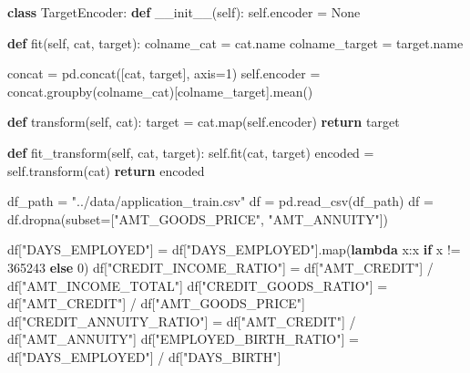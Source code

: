 \documentclass[11pt]{jsarticle}
\newenvironment{Shaded}{}{}
\newcommand{\KeywordTok}[1]{\textcolor[rgb]{0.00,0.44,0.13}{\textbf{{#1}}}}
\newcommand{\DecValTok}[1]{\textcolor[rgb]{0.25,0.63,0.44}{{#1}}}
\newcommand{\StringTok}[1]{\textcolor[rgb]{0.25,0.44,0.63}{{#1}}}
\newcommand{\FunctionTok}[1]{\textcolor[rgb]{0.02,0.16,0.49}{{#1}}}
\newcommand{\NormalTok}[1]{{#1}}
\newcommand{\VariableTok}[1]{\textcolor[rgb]{0.10,0.09,0.49}{{#1}}}
\newcommand{\ControlFlowTok}[1]{\textcolor[rgb]{0.00,0.44,0.13}{\textbf{{#1}}}}
\newcommand{\OperatorTok}[1]{\textcolor[rgb]{0.40,0.40,0.40}{{#1}}}
\newcommand{\BuiltInTok}[1]{{#1}}
\begin{document}
    \begin{Shaded}
\begin{Highlighting}[]
\KeywordTok{class}\NormalTok{ TargetEncoder:}
    \KeywordTok{def} \FunctionTok{__init__}\NormalTok{(}\VariableTok{self}\NormalTok{):}
        \VariableTok{self}\NormalTok{.encoder }\OperatorTok{=} \VariableTok{None}
        
    \KeywordTok{def}\NormalTok{ fit(}\VariableTok{self}\NormalTok{, cat, target):}
\NormalTok{        colname_cat }\OperatorTok{=}\NormalTok{ cat.name}
\NormalTok{        colname_target }\OperatorTok{=}\NormalTok{ target.name}
        
\NormalTok{        concat }\OperatorTok{=}\NormalTok{ pd.concat([cat, target], axis}\OperatorTok{=}\DecValTok{1}\NormalTok{)}
        \VariableTok{self}\NormalTok{.encoder }\OperatorTok{=}\NormalTok{ concat.groupby(colname_cat)[colname_target].mean()}
    
    \KeywordTok{def}\NormalTok{ transform(}\VariableTok{self}\NormalTok{, cat):}
\NormalTok{        target }\OperatorTok{=}\NormalTok{ cat.}\BuiltInTok{map}\NormalTok{(}\VariableTok{self}\NormalTok{.encoder)}
        \ControlFlowTok{return}\NormalTok{ target}
    
    \KeywordTok{def}\NormalTok{ fit_transform(}\VariableTok{self}\NormalTok{, cat, target):}
        \VariableTok{self}\NormalTok{.fit(cat, target)}
\NormalTok{        encoded }\OperatorTok{=} \VariableTok{self}\NormalTok{.transform(cat)}
        \ControlFlowTok{return}\NormalTok{ encoded}

\NormalTok{df_path }\OperatorTok{=} \StringTok{"../data/application_train.csv"}
\NormalTok{df }\OperatorTok{=}\NormalTok{ pd.read_csv(df_path)}
\NormalTok{df }\OperatorTok{=}\NormalTok{ df.dropna(subset}\OperatorTok{=}\NormalTok{[}\StringTok{"AMT_GOODS_PRICE"}\NormalTok{, }\StringTok{"AMT_ANNUITY"}\NormalTok{])}

\NormalTok{df[}\StringTok{"DAYS_EMPLOYED"}\NormalTok{] }\OperatorTok{=}\NormalTok{ df[}\StringTok{"DAYS_EMPLOYED"}\NormalTok{].}\BuiltInTok{map}\NormalTok{(}\KeywordTok{lambda}\NormalTok{ x:x }\ControlFlowTok{if}\NormalTok{ x }\OperatorTok{!=} \DecValTok{365243} \ControlFlowTok{else} \DecValTok{0}\NormalTok{)}
\NormalTok{df[}\StringTok{"CREDIT_INCOME_RATIO"}\NormalTok{] }\OperatorTok{=}\NormalTok{ df[}\StringTok{"AMT_CREDIT"}\NormalTok{] }\OperatorTok{/}\NormalTok{ df[}\StringTok{"AMT_INCOME_TOTAL"}\NormalTok{]}
\NormalTok{df[}\StringTok{"CREDIT_GOODS_RATIO"}\NormalTok{] }\OperatorTok{=}\NormalTok{ df[}\StringTok{"AMT_CREDIT"}\NormalTok{] }\OperatorTok{/}\NormalTok{ df[}\StringTok{"AMT_GOODS_PRICE"}\NormalTok{]}
\NormalTok{df[}\StringTok{"CREDIT_ANNUITY_RATIO"}\NormalTok{] }\OperatorTok{=}\NormalTok{ df[}\StringTok{"AMT_CREDIT"}\NormalTok{] }\OperatorTok{/}\NormalTok{ df[}\StringTok{"AMT_ANNUITY"}\NormalTok{]}
\NormalTok{df[}\StringTok{"EMPLOYED_BIRTH_RATIO"}\NormalTok{] }\OperatorTok{=}\NormalTok{ df[}\StringTok{"DAYS_EMPLOYED"}\NormalTok{] }\OperatorTok{/}\NormalTok{ df[}\StringTok{"DAYS_BIRTH"}\NormalTok{]}


\end{Highlighting}
\end{Shaded}
\end{document}
